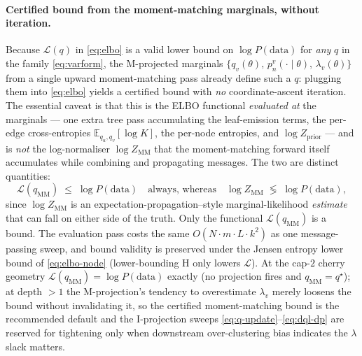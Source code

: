 \paragraph{Certified bound from the moment-matching marginals, without
iteration.} Because $\mathcal{L}(q)$ in \eqref{eq:elbo} is a valid
lower bound on $\log P(\text{data})$ for \emph{any} $q$ in the family
\eqref{eq:varform}, the M-projected marginals
$\{q_v(\theta),\,p_n^v(\cdot\!\mid\!\theta),\,\lambda_v(\theta)\}$ from
a single upward moment-matching pass already define such a $q$: plugging
them into \eqref{eq:elbo} yields a certified bound with \emph{no}
coordinate-ascent iteration. The essential caveat is that this is the
ELBO functional \emph{evaluated at} the marginals --- one extra tree
pass accumulating the leaf-emission terms, the per-edge cross-entropies
$\mathbb{E}_{q_u,q_v}[\log K]$, the per-node entropies, and $\log
Z_{\text{prior}}$ --- and is \emph{not} the log-normaliser $\log
Z_{\mathrm{MM}}$ that the moment-matching forward itself accumulates
while combining and propagating messages. The two are distinct
quantities:
\begin{equation}
  \mathcal{L}(q_{\mathrm{MM}}) \;\le\; \log P(\text{data})
  \quad\text{always, whereas}\quad
  \log Z_{\mathrm{MM}} \;\lessgtr\; \log P(\text{data}),
  \label{eq:mm-not-a-bound}
\end{equation}
since $\log Z_{\mathrm{MM}}$ is an expectation-propagation--style
marginal-likelihood \emph{estimate} that can fall on either side of the
truth. Only the functional $\mathcal{L}(q_{\mathrm{MM}})$ is a bound.
The evaluation pass costs the same $O(N\cdot m\cdot L\cdot k^2)$ as one
message-passing sweep, and bound validity is preserved under the Jensen
entropy lower bound of \eqref{eq:elbo-node} (lower-bounding $\mathrm{H}$
only lowers $\mathcal{L}$). At the cap-$2$ cherry geometry
$\mathcal{L}(q_{\mathrm{MM}}) = \log P(\text{data})$ exactly (no
projection fires and $q_{\mathrm{MM}}=q^\star$); at depth $>1$ the
M-projection's tendency to overestimate $\lambda_v$ merely loosens the
bound without invalidating it, so the certified moment-matching bound is
the recommended default and the I-projection sweeps
\eqref{eq:q-update}--\eqref{eq:dql-dp} are reserved for tightening only
when downstream over-clustering bias indicates the $\lambda$ slack
matters.

